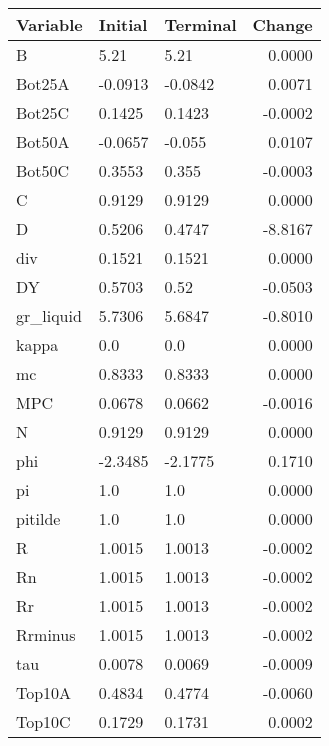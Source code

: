 \begin{table}
\centering
\label{tab:stst_comparison_fast_shock_limit_permanent}
\begin{tabular}{lllr}
\toprule
                Variable & Initial & Terminal &  Change \\
\midrule
                       B &    5.21 &     5.21 &  0.0000 \\
                  Bot25A & -0.0913 &  -0.0842 &  0.0071 \\
                  Bot25C &  0.1425 &   0.1423 & -0.0002 \\
                  Bot50A & -0.0657 &   -0.055 &  0.0107 \\
                  Bot50C &  0.3553 &    0.355 & -0.0003 \\
                       C &  0.9129 &   0.9129 &  0.0000 \\
                       D &  0.5206 &   0.4747 & -8.8167 \\
                     div &  0.1521 &   0.1521 &  0.0000 \\
                      DY &  0.5703 &     0.52 & -0.0503 \\
               gr\_liquid &  5.7306 &   5.6847 & -0.8010 \\
                   kappa &     0.0 &      0.0 &  0.0000 \\
                      mc &  0.8333 &   0.8333 &  0.0000 \\
                     MPC &  0.0678 &   0.0662 & -0.0016 \\
                       N &  0.9129 &   0.9129 &  0.0000 \\
                     phi & -2.3485 &  -2.1775 &  0.1710 \\
                      pi &     1.0 &      1.0 &  0.0000 \\
                 pitilde &     1.0 &      1.0 &  0.0000 \\
                       R &  1.0015 &   1.0013 & -0.0002 \\
                      Rn &  1.0015 &   1.0013 & -0.0002 \\
                      Rr &  1.0015 &   1.0013 & -0.0002 \\
                 Rrminus &  1.0015 &   1.0013 & -0.0002 \\
                     tau &  0.0078 &   0.0069 & -0.0009 \\
                  Top10A &  0.4834 &   0.4774 & -0.0060 \\
                  Top10C &  0.1729 &   0.1731 &  0.0002 \\

\end{tabular}
\end{table}
